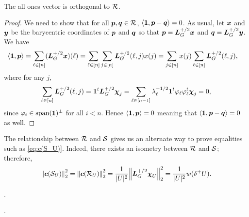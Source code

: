 \begin{lemma}
The all ones vector is orthogonal to $\mathcal{R}$. 
\end{lemma}
\begin{proof}
We need to show that for all $\vb*{p},\vb*{q}\in\mathcal{R}$, $\langle \vb{1},\vb*{p}-\vb*{q}\rangle=0$. As usual, let $\vb*{x}$ and $\vb*{y}$ be the barycentric coordinates of $\vb*{p}$ and $\vb*{q}$ so that $\vb*{p}=\vb*{L}_G^{+/2}\vb*{x}$ and $\vb*{q}=\vb*{L}_G^{+/2}\vb*{y}$. We have
\begin{align*}
    \langle \vb{1},\vb*{p}\rangle &= \sum_{\ell\in[n]} (\vb*{L}_G^{+/2}\vb*{x})(\ell) = \sum_{\ell\in[n]} \sum_{j\in [n]}\vb*{L}_G^{+/2}(\ell,j)x(j) = \sum_{j\in[n]}x(j) \sum_{\ell\in[n]}\vb*{L}_G^{+/2}(\ell,j),
\end{align*}
where for any $j$, 
\[\sum_{\ell\in[n]}\vb*{L}_G^{+/2}(\ell,j)= \vb{1}^t \vb*{L}_G^{+/2}\boldsymbol{\chi}_j=\sum_{\ell\in[n-1]} \lambda_\ell^{-1/2}\vb{1}^t \varphi_\ell\varphi_\ell^t\boldsymbol{\chi}_j=0,\]
since $\varphi_i\in\textnormal{span}(\vb{1})^\perp$  for all $i<n$. Hence  $\langle \vb{1},\vb*{p}\rangle=0$ meaning that $\langle \vb{1},\vb*{p}-\vb*{q}\rangle=0$ as well. 
\end{proof}

The relationship between $\mathcal{R}$ and $\mathcal{S}$ gives us an alternate way to prove equalities such as \eqref{eq:c(S_U)}. Indeed, there exists an isometry between $\mathcal{R}$ and $\mathcal{S}$; therefore, 
\begin{equation*}
    \norm{\vb*{c}(\mathcal{S}_U)}_2^2 = \norm{\vb*{c}(\mathcal{R}_U)}_2^2 = \frac{1}{|U|^2} \norm{\vb*{L}_G^{+/2}\boldsymbol{\chi}_U}_2^2 = \frac{1}{|U|^2}w(\delta^+ U).
\end{equation*}


. 

. 

